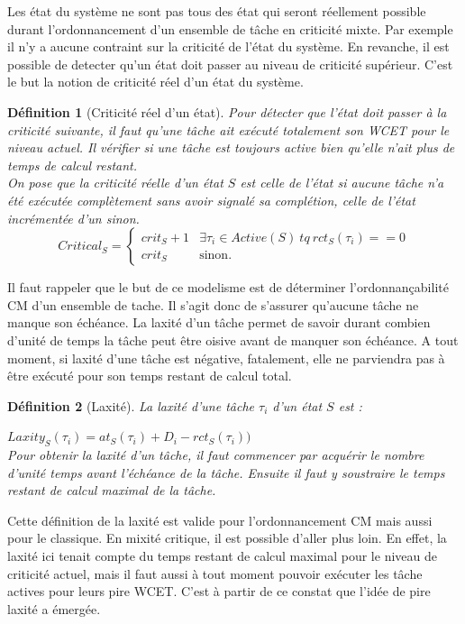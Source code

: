 \documentclass[12pt,a4paper,oneside]{book}
\theoremstyle{break}
\newtheorem{defin}{Définition}[chapter]
\theoremstyle{breakplain}
\begin{document}
Les état du système ne sont pas tous des état qui seront réellement possible durant l'ordonnancement d'un ensemble de tâche en criticité mixte. Par exemple il n'y a aucune contraint sur la criticité de l'état du système. En revanche, il est possible de detecter qu'un état doit passer au niveau de criticité supérieur. C'est le but la notion de criticité réel d'un état du système.


\begin{defin}[Criticité réel d'un état]
Pour détecter que l'état doit passer à la criticité suivante, il faut qu'une tâche ait exécuté totalement son WCET pour le niveau actuel. Il vérifier si une tâche est toujours active bien qu'elle n'ait plus de temps de calcul restant.\\
On pose que la criticité réelle d'un état $S$ est celle de l'état si aucune tâche n'a été exécutée complètement sans avoir signalé sa complétion, celle de l'état incrémentée d'un sinon.
$$
Critical_S = \left\{
    \begin{array}{ll}
        crit_S+1 & \exists \tau_i \in Active(S)\ tq\ rct_S(\tau_i) == 0 \\
        crit_S & \mbox{sinon.}
    \end{array}
\right.
$$
\end{defin}

Il faut rappeler que le but de ce modelisme est de déterminer l'ordonnançabilité CM d'un ensemble de tache. Il s'agit donc de s'assurer qu'aucune tâche ne manque son échéance. La laxité d'un tâche permet de savoir durant combien d'unité de temps la tâche peut être oisive avant de manquer son échéance. A tout moment, si laxité d'une tâche est négative, fatalement,  elle ne parviendra pas à être exécuté pour son temps restant de calcul total.

\begin{defin}[Laxité]
La laxité d'une tâche $\tau_i$ d'un état $S$ est :

$Laxity_S(\tau_i) = at_S(\tau_i)  + D_i - rct_S(\tau_i))$\\

Pour obtenir la laxité d'un tâche, il faut commencer par acquérir le nombre d'unité temps avant l'échéance de la tâche. Ensuite il faut y soustraire le temps restant de calcul maximal de la tâche.
\end{defin}

Cette définition de la laxité est valide pour l'ordonnancement CM mais aussi pour le classique. En mixité critique, il est possible d'aller plus loin. En effet, la laxité ici tenait compte du temps restant de calcul maximal pour le niveau de criticité actuel, mais il faut aussi à tout moment pouvoir exécuter les tâche actives pour leurs pire WCET. C'est à partir de ce constat que l'idée de pire laxité a émergée.
\end{document}
